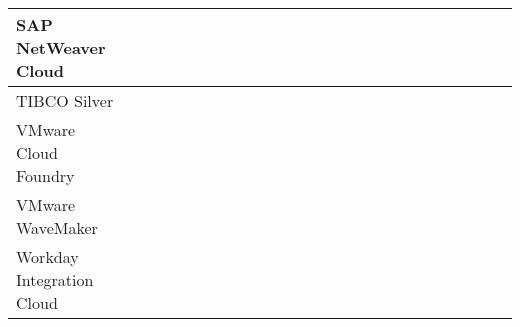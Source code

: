\begin{longtable}{IL{7.5em}IC{.2cm}|C{.2cm}|C{.2cm}|C{.2cm}IC{.2cm}|C{.2cm}|C{.2cm}|C{.2cm}|C{.2cm}IC{.2cm}|C{.2cm}|C{.2cm}IC{.2cm}|C{.2cm}|C{.2cm}|C{.2cm}|C{.2cm}|C{.2cm}I}
SAP NetWeaver Cloud &
	 & & & 
	& & & & & 
	& & & 
	& & & & & & \\\hline

TIBCO Silver &
	 & & & 
	& & & & & 
	& & & 
	& & & & & & \\\hline

VMware Cloud Foundry &
	 & & & 
	& & & & & 
	& & & 
	& & & & & & \\\hline

VMware WaveMaker &
	 & & & 
	& & & & & 
	& & & 
	& & & & & & \\ \hline

Workday Integration Cloud &
	 & & & 
	& & & & & 
	& & & 
	& & & & & & \\



	

\end{longtable}
